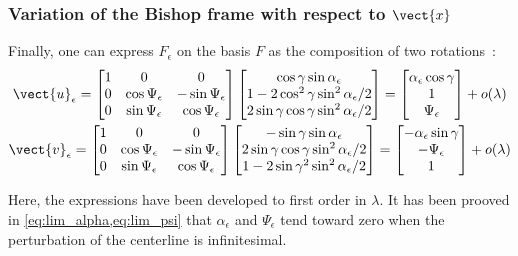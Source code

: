 \subsubsection{Variation of the Bishop frame with respect to $\vect{x}$}
Finally, one can express $F_\epsilon$ on the basis $F$ as the composition of two rotations~:
\begin{subequations}
	\begin{gather}
	\vect{u}_\epsilon =
	\begin{bmatrix}
		1 & 0 & 0 \\
		0 & \cos{\Psi_\epsilon} & -\sin{\Psi_\epsilon} \\
		0 & \sin{\Psi_\epsilon} & \cos{\Psi_\epsilon}
	\end{bmatrix}
	\begin{bmatrix}
		\cos{\gamma}\sin{\alpha_\epsilon} \\
		1-2\cos^2{\gamma}\sin^2{\alpha_\epsilon/2} \\
		2\sin{\gamma}\cos{\gamma}\sin^2{\alpha_\epsilon/2}
	\end{bmatrix}
	=
	\begin{bmatrix}
		\alpha_\epsilon\cos{\gamma}\\
		1 \\
		\Psi_\epsilon
	\end{bmatrix}
	+ o(\lambda)
	\\
	\vect{v}_\epsilon =
	\begin{bmatrix}
		1 & 0 & 0 \\
		0 & \cos{\Psi_\epsilon} & -\sin{\Psi_\epsilon} \\
		0 & \sin{\Psi_\epsilon} & \cos{\Psi_\epsilon}
	\end{bmatrix}
	\begin{bmatrix}
		-\sin{\gamma}\sin{\alpha_\epsilon} \\
		2\sin{\gamma}\cos{\gamma}\sin^2{\alpha_\epsilon/2} \\
		1-2\sin{\gamma}^2\sin^2{\alpha_\epsilon/2}
	\end{bmatrix}
	=
	\begin{bmatrix}
		-\alpha_\epsilon\sin{\gamma}\\
		-\Psi_\epsilon \\
		1
	\end{bmatrix}
	+ o(\lambda)
	\end{gather}
\end{subequations}

%
Here, the expressions have been developed to first order in $\lambda$. It has been prooved in \cref{eq:lim_alpha,eq:lim_psi} that $\alpha_\epsilon$ and $\Psi_\epsilon$ tend toward zero when the perturbation of the centerline is infinitesimal.

